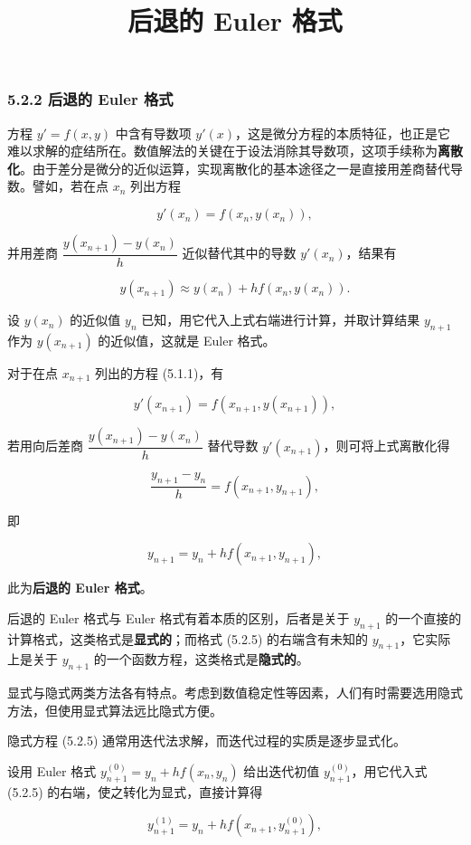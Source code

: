 \documentclass[
  10pt,
  fontset=fandol]{ctexart}
\title{后退的 Euler 格式}
\author{}
\date{}
\begin{document}
\maketitle

\subsubsection{5.2.2 后退的 Euler 格式}\label{ux540eux9000ux7684-euler-ux683cux5f0f}

方程 \(y'=f(x,y)\) 中含有导数项 \(y'(x)\)，这是微分方程的本质特征，也正是它难以求解的症结所在。数值解法的关键在于设法消除其导数项，这项手续称为\textbf{离散化}。由于差分是微分的近似运算，实现离散化的基本途径之一是直接用差商替代导数。譬如，若在点 \(x_n\) 列出方程

\[
y'(x_n)=f(x_n,y(x_n)),\tag{5.2.4}
\]

并用差商 \(\dfrac{y(x_{n+1})-y(x_n)}{h}\) 近似替代其中的导数 \(y'(x_n)\)，结果有

\[
y(x_{n+1})\approx y(x_n)+hf(x_n,y(x_n)).
\]

设 \(y(x_n)\) 的近似值 \(y_n\) 已知，用它代入上式右端进行计算，并取计算结果 \(y_{n+1}\) 作为 \(y(x_{n+1})\) 的近似值，这就是 Euler 格式。

对于在点 \(x_{n+1}\) 列出的方程 (5.1.1)，有

\[
y'(x_{n+1})=f(x_{n+1},y(x_{n+1})),
\]

若用向后差商 \(\dfrac{y(x_{n+1})-y(x_n)}{h}\) 替代导数 \(y'(x_{n+1})\)，则可将上式离散化得

\[
\frac{y_{n+1}-y_n}{h}=f(x_{n+1},y_{n+1}),
\]

即

\[
y_{n+1}=y_n+hf(x_{n+1},y_{n+1}),\tag{5.2.5}
\]

此为\textbf{后退的 Euler 格式}。

后退的 Euler 格式与 Euler 格式有着本质的区别，后者是关于 \(y_{n+1}\) 的一个直接的计算格式，这类格式是\textbf{显式的}；而格式 (5.2.5) 的右端含有未知的 \(y_{n+1}\)，它实际上是关于 \(y_{n+1}\) 的一个函数方程，这类格式是\textbf{隐式的}。

显式与隐式两类方法各有特点。考虑到数值稳定性等因素，人们有时需要选用隐式方法，但使用显式算法远比隐式方便。

隐式方程 (5.2.5) 通常用迭代法求解，而迭代过程的实质是逐步显式化。

设用 Euler 格式 \(y_{n+1}^{(0)}=y_n+hf(x_n,y_n)\) 给出迭代初值 \(y_{n+1}^{(0)}\)，用它代入式 (5.2.5) 的右端，使之转化为显式，直接计算得

\[
y_{n+1}^{(1)}=y_n+hf(x_{n+1},y_{n+1}^{(0)}),
\]
\end{document}

